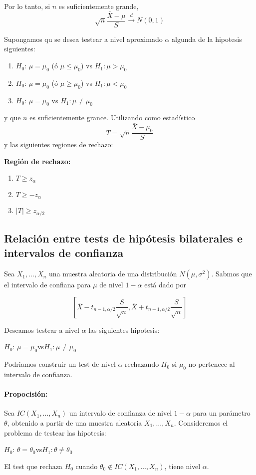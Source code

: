 Por lo tanto, si $n$ es suficientemente grande, $$\sqrt{n}\frac{\bar{X} - \mu}{S}\overset{d}{\longrightarrow} N(0,1)$$


Supongamos qu se desea testear a nivel aproximado $\alpha$ algunda de la hipotesis siguientes:

\begin{enumerate}
	\item $H_0$: $\mu = \mu_0$ (ó $\mu \leq \mu_0$) vs  $H_1: \mu > \mu_0$
	\item $H_0$: $\mu = \mu_0$ (ó $\mu \geq \mu_0$) vs  $H_1: \mu < \mu_0$
	\item $H_0$: $\mu = \mu_0$ vs  $H_1: \mu \neq \mu_0$
\end{enumerate}

y que $n$ es suficientemente grance. Utilizando como estadístico $$T = \sqrt{n}\frac{\bar{X}-\mu_0}{S}$$ y las siguientes regiones de rechazo:

\textbf{Región de rechazo:}
\begin{enumerate}
	\item $T\geq z_{\alpha}$
	\item $T \geq -z_{\alpha}$
	\item $|T| \geq z_{\alpha/2}$
\end{enumerate}

\subsection{Relación entre tests de hipótesis bilaterales e intervalos de confianza} 
Sea $X_1,\dots,X_n$ una muestra aleatoria de una distribución $N(\mu,\sigma^2)$. Sabmos que el intervalo de confiana para $\mu$ de nivel $1-\alpha$ está dado por

$$\left[\bar{X} - t_{n-1,\alpha/2}\frac{S}{\sqrt{n}}, \bar{X} + t_{n-1,\alpha/2}\frac{S}{\sqrt{n}}\right]$$

Deseamos testear a nivel $\alpha$ las siguientes hipotesis:

\begin{center}
 $H_0$: $\mu = \mu_0$\hspace*{1cm}vs\hspace*{1cm}$H_1:\mu\neq\mu_0$
\end{center}

Podriamos construir un test de nivel $\alpha$ rechazando $H_0$ si $\mu_0$ no pertenece al intervalo de confianza.

\paragraph{Propocisión:} Sea $IC(X_1,\dots,X_n)$ un intervalo de confianza de nivel $1-\alpha$ para un parámetro $\theta$, obtenido a partir de una muestra aleatoria $X_1,\dots,X_n$. Consideremos el problema de testear las hipotesis:
\begin{center}
	$H_0$: $\theta = \theta_0$\hspace*{1cm}vs\hspace*{1cm}$H_1:\theta\neq\theta_0$
\end{center}

El test que rechaza $H_0$ cuando $\theta_0\notin IC(X_1,\dots,X_n)$, tiene nivel $\alpha$.	